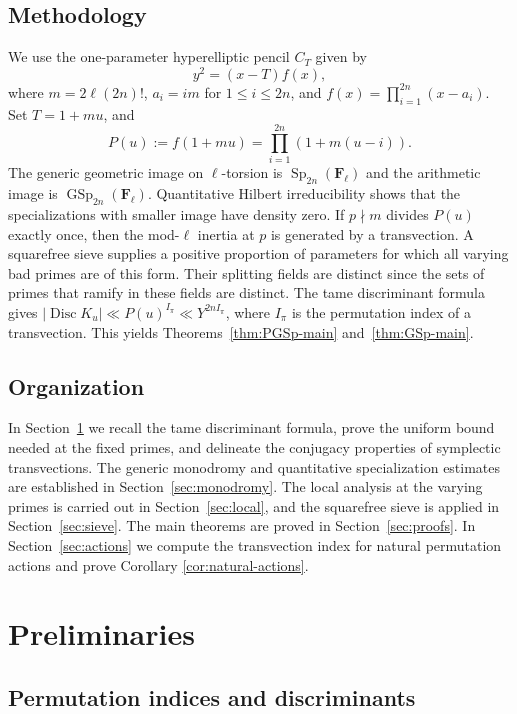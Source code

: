 \documentclass[11pt,hidelinks]{amsart}
\newcommand{\F}{\mathbf F}
\newcommand{\GSp}{\operatorname{GSp}}
\newcommand{\Sp}{\operatorname{Sp}}
\newcommand{\Disc}{\operatorname{Disc}}
\begin{document}
\subsection{Methodology}

We use the one-parameter hyperelliptic pencil $C_T$ given by \[y^2=(x-T)f(x),\] where $m=2\ell(2n)!$, $a_i=im$ for $1\leq i\leq 2n$, and $f(x)=\prod_{i=1}^{2n}(x-a_i)$.  Set $T=1+mu$, and \[P(u):=f(1+mu)=\prod_{i=1}^{2n}(1+m(u-i)).\]
The generic geometric image on $\ell$-torsion is $\Sp_{2n}(\F_\ell)$ and the arithmetic image is $\GSp_{2n}(\F_\ell)$.  Quantitative Hilbert irreducibility shows that the specializations with smaller image have density zero. If $p\nmid m$ divides $P(u)$ exactly once, then the mod-$\ell$ inertia at $p$ is generated by a transvection. A squarefree sieve supplies a positive proportion of parameters for which all varying bad primes are of this form. Their splitting fields are distinct since the sets of primes that ramify in these fields are distinct. The tame discriminant formula gives $|\Disc K_u|\ll P(u)^{I_\pi}\ll Y^{2nI_\pi}$, where $I_\pi$ is the permutation index of a transvection. This yields Theorems~\ref{thm:PGSp-main} and~\ref{thm:GSp-main}.

\subsection{Organization}

In Section~\ref{sec:preliminaries} we recall the tame discriminant formula, prove the uniform bound needed at the fixed primes, and delineate the conjugacy properties of symplectic transvections. The generic monodromy and quantitative specialization estimates are established in Section~\ref{sec:monodromy}. The local analysis at the varying primes is carried out in Section~\ref{sec:local}, and the squarefree sieve is applied in Section~\ref{sec:sieve}. The main theorems are proved in Section~\ref{sec:proofs}. In Section~\ref{sec:actions} we compute the transvection index for natural permutation actions and prove Corollary \ref{cor:natural-actions}.


\section{Preliminaries}\label{sec:preliminaries}


\subsection{Permutation indices and discriminants}
\end{document}
